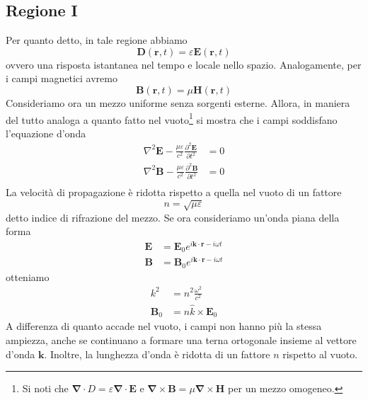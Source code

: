 \documentclass[a4paper,11pt]{book}
\newcommand{\der}[3][]{\frac{\partial ^{#1}#2}{\partial {#3}^{#1}}}
\let\oldnabla\nabla
\renewcommand{\nabla}{\vec{\oldnabla}}
\newcommand{\lap}{\oldnabla^2}
\renewcommand{\vec}[1]{\mathbf{#1}}
\theoremstyle{theorem}
\theoremstyle{definition}
\begin{document}
\subsection{Regione I}
Per quanto detto, in tale regione abbiamo
\[\vec{D}(\vec{r},t)=\varepsilon\vec{E}(\vec{r},t)\]
ovvero una risposta istantanea nel tempo e locale nello spazio. Analogamente, per i campi magnetici avremo
\[\vec{B}(\vec{r},t)=\mu\vec{H}(\vec{r},t)\]
Consideriamo ora un mezzo uniforme senza sorgenti esterne. Allora, in maniera del tutto analoga a quanto fatto nel vuoto\footnote{Si noti che $\nabla \cdot  {D}=\varepsilon\nabla\cdot\vec{E}$ e $\nabla\times\vec{B}=\mu\nabla\times\vec{H}$ per un mezzo omogeneo.} si mostra che i campi soddisfano l'equazione d'onda
\begin{align*}
	\lap\vec{E}-\frac{\mu\varepsilon}{c^2}\der[2]{\vec{E}}{t}&=0\\
	\lap\vec{B}-\frac{\mu\varepsilon}{c^2}\der[2]{\vec{B}}{t}&=0\\
\end{align*}
La velocità di propagazione è ridotta rispetto a quella nel vuoto di un fattore
\[n=\sqrt{\mu\varepsilon}\]
detto indice di rifrazione del mezzo. Se ora consideriamo un'onda piana della forma
\begin{align*}
	\vec{E}&=\vec{E}_0e^{i\vec{k}\cdot\vec{r}-i\omega t}\\
	\vec{B}&=\vec{B}_0e^{i\vec{k}\cdot\vec{r}-i\omega t}
\end{align*}
otteniamo
\begin{align*}k^2&=n^2\frac{\omega^2}{c^2}\\\vec{B}_0&=n\hat{k}\times\vec{E}_0\end{align*}
A differenza di quanto accade nel vuoto, i campi non hanno più la stessa ampiezza, anche se continuano a formare una terna ortogonale insieme al vettore d'onda $\vec{k}$. Inoltre, la lunghezza d'onda è ridotta di un fattore $n$ rispetto al vuoto.
\end{document}
